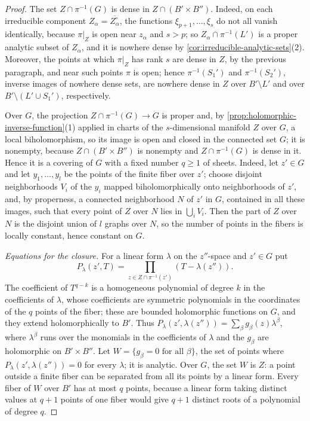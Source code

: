 \begin{proof}
The set $Z\cap\pi^{-1}(G)$ is dense in $Z\cap(B'\times B'')$. Indeed, on each irreducible component $Z_\alpha=\overline{Z^\circ_\alpha}$, the functions $\xi_{p+1},\ldots,\xi_s$ do not all vanish identically, because $\pi|_Z$ is open near $z_\alpha$ and $s>p$; so $Z_\alpha\cap\pi^{-1}(L')$ is a proper analytic subset of $Z_\alpha$, and it is nowhere dense by \cref{cor:irreducible-analytic-sets}(2). Moreover, the points at which $\pi|_Z$ has rank $s$ are dense in $Z$, by the previous paragraph, and near such points $\pi$ is open; hence $\pi^{-1}(S_1')$ and $\pi^{-1}(S_2')$, inverse images of nowhere dense sets, are nowhere dense in $Z$ over $B'\setminus L'$ and over $B'\setminus(L'\cup S_1')$, respectively.

Over $G$, the projection $Z\cap\pi^{-1}(G)\to G$ is proper and, by \cref{prop:holomorphic-inverse-function}(1) applied in charts of the $s$-dimensional manifold $Z$ over $G$, a local biholomorphism, so its image is open and closed in the connected set $G$; it is nonempty, because $Z\cap(B'\times B'')$ is nonempty and $Z\cap\pi^{-1}(G)$ is dense in it. Hence it is a covering of $G$ with a fixed number $q\geq1$ of sheets. Indeed, let $z'\in G$ and let $y_1,\ldots,y_l$ be the points of the finite fiber over $z'$; choose disjoint neighborhoods $V_i$ of the $y_i$ mapped biholomorphically onto neighborhoods of $z'$, and, by properness, a connected neighborhood $N$ of $z'$ in $G$, contained in all these images, such that every point of $Z$ over $N$ lies in $\bigcup_iV_i$. Then the part of $Z$ over $N$ is the disjoint union of $l$ graphs over $N$, so the number of points in the fibers is locally constant, hence constant on $G$.

\emph{Equations for the closure.} For a linear form $\lambda$ on the $z''$-space and $z'\in G$ put
\[
 P_\lambda(z',T)=\prod_{z\in Z\cap\pi^{-1}(z')}
                         (T-\lambda(z'')).
\]
The coefficient of $T^{q-k}$ is a homogeneous polynomial of degree $k$ in the coefficients of $\lambda$, whose coefficients are symmetric polynomials in the coordinates of the $q$ points of the fiber; these are bounded holomorphic functions on $G$, and they extend holomorphically to $B'$. Thus $P_\lambda(z',\lambda(z''))=\sum_\beta g_\beta(z)\lambda^\beta$, where $\lambda^\beta$ runs over the monomials in the coefficients of $\lambda$ and the $g_\beta$ are holomorphic on $B'\times B''$. Let $W=\{g_\beta=0\text{ for all }\beta\}$, the set of points where $P_\lambda(z',\lambda(z''))=0$ for every $\lambda$; it is analytic. Over $G$, the set $W$ is $Z$: a point outside a finite fiber can be separated from all its points by a linear form. Every fiber of $W$ over $B'$ has at most $q$ points, because a linear form taking distinct values at $q+1$ points of one fiber would give $q+1$ distinct roots of a polynomial of degree $q$.


\end{proof}
